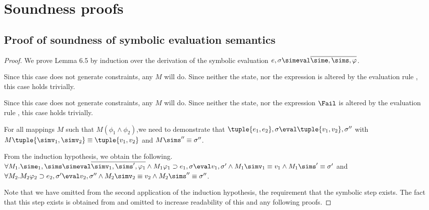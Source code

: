 


\section{Soundness proofs}
\label{sec:soundness-proofs}

\subsection{Proof of soundness of symbolic evaluation semantics}
\begin{proof}
  We prove Lemma 6.5 by induction over the derivation of the symbolic evaluation $e,\sigma\simeval\overline{\sime,\sims,\phi}$.

    {Since this case does not generate constraints, any $M$ will do.
    Since neither the state, nor the expression is altered by the evaluation rule ,
    this case holds trivially.
    }

      {Since this case does not generate constraints, any $M$ will do.
      Since neither the state, nor the expression $\Fail$ is altered by the evaluation rule ,
      this case holds trivially.
      }
    {For all mappings $M$ such that $M(\phi_1\wedge\phi_2)$,we need to demonstrate that
    $\tuple{e_1,e_2},\sigma\eval\tuple{v_1,v_2},\sigma''$ with
    $M\tuple{\simv_1,\simv_2} \equiv \tuple{v_1,v_2}$ and $M\sims''\equiv\sigma''$.

    From the induction hypothesis, we obtain the following.\\
    $\forall M_1 . \sime_1,\sims\simeval\overline{\simv_1,\sims',\phi_1}\land M_1\phi_1 \implies e_1,\sigma \eval v_1,\sigma'\land  M_1\simv_1\equiv v_1 \land  M_1\sims'\equiv\sigma'$ and
    $\forall M_2 . M_2\phi_2 \implies e_2, \sigma'\eval v_2,\sigma''\land M_2 \simv_2\equiv v_2\land M_2\sims''\equiv\sigma''$.

    Note that we have omitted from the second application of the induction hypothesis, the requirement that the symbolic step exists.
    The fact that this step exists is obtained from  and omitted to increase readability of this and any following proofs.

}
\end{proof}
